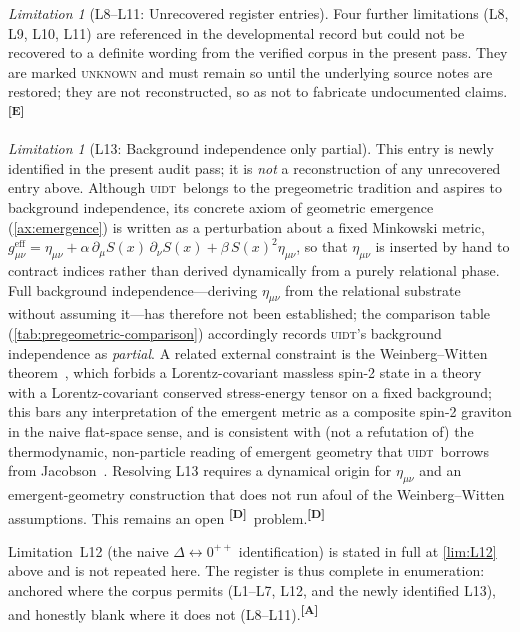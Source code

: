 \documentclass[12pt,a4paper,twoside]{article}
\theoremstyle{plain}
\theoremstyle{definition}
\theoremstyle{remark}
\newtheorem{limitation}[theorem]{Limitation}
\newcommand{\UIDT}{\textsc{uidt}}
\newcommand{\catmark}[1]{\textsuperscript{\textsf{\textbf{[#1]}}}}
\newcommand{\Sx}{S(x)}
\begin{document}
\begin{limitation}[L8--L11: Unrecovered register entries]
\label{lim:L8toL11}
Four further limitations (L8, L9, L10, L11) are referenced in the developmental record but could not be recovered to a definite wording from the verified corpus in the present pass. They are marked \textsc{unknown} and must remain so until the underlying source notes are restored; they are not reconstructed, so as not to fabricate undocumented claims.\catmark{E}
\end{limitation}

\begin{limitation}[L13: Background independence only partial]
\label{lim:L13}
This entry is newly identified in the present audit pass; it is \emph{not} a reconstruction of any unrecovered entry above. Although \UIDT\ belongs to the pregeometric tradition and aspires to background independence, its concrete axiom of geometric emergence (\cref{ax:emergence}) is written as a perturbation about a fixed Minkowski metric, $g_{\mu\nu}^{\mathrm{eff}}=\eta_{\mu\nu}+\alpha\,\partial_\mu\Sx\,\partial_\nu\Sx+\beta\,\Sx^2\eta_{\mu\nu}$, so that $\eta_{\mu\nu}$ is inserted by hand to contract indices rather than derived dynamically from a purely relational phase. Full background independence---deriving $\eta_{\mu\nu}$ from the relational substrate without assuming it---has therefore not been established; the comparison table (\cref{tab:pregeometric-comparison}) accordingly records \UIDT's background independence as \emph{partial}. A related external constraint is the Weinberg--Witten theorem~\cite{weinbergwitten1980}, which forbids a Lorentz-covariant massless spin-2 state in a theory with a Lorentz-covariant conserved stress-energy tensor on a fixed background; this bars any interpretation of the emergent metric as a composite spin-2 graviton in the naive flat-space sense, and is consistent with (not a refutation of) the thermodynamic, non-particle reading of emergent geometry that \UIDT\ borrows from Jacobson~\cite{jacobson1995}. Resolving L13 requires a dynamical origin for $\eta_{\mu\nu}$ and an emergent-geometry construction that does not run afoul of the Weinberg--Witten assumptions. This remains an open \catmark{D}\ problem.\catmark{D}
\end{limitation}

\noindent Limitation~L12 (the naive $\Delta\!\leftrightarrow\!0^{++}$ identification) is stated in full at \cref{lim:L12} above and is not repeated here. The register is thus complete in enumeration: anchored where the corpus permits (L1--L7, L12, and the newly identified L13), and honestly blank where it does not (L8--L11).\catmark{A}
\end{document}
